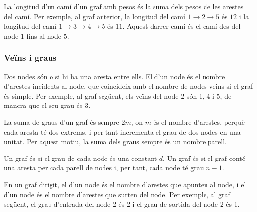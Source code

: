 La longitud d'un camí d'un graf amb pesos és la suma dels pesos de les
arestes del camí. Per exemple, al graf anterior, la longitud del camí
$1 \rightarrow 2 \rightarrow 5$ és $12$ i la longitud del camí $1
\rightarrow 3 \rightarrow 4 \rightarrow 5$ és $11$. Aquest darrer camí
és el camí  des del node $1$ fins al node $5$.

\subsubsection{Veïns i graus}

 

Dos nodes són  o  si hi ha una aresta entre
ells. El  d'un node és el nombre d'arestes incidents al
node, que coincideix amb el nombre de nodes veins si el graf és
simple. Per exemple, al graf següent, els veïns del node 2 són 1, 4 i
5, de manera que el seu grau és 3.


\begin{center}
\end{center}


La suma de graus d'un graf és sempre $2m$, on $m$ és el nombre
d'arestes, perquè cada aresta té dos extrems, i per tant incrementa el
grau de dos nodes en una unitat. Per aquest motiu, la suma dels graus
sempre és un nombre parell.

 

Un graf és  si el grau de cada node és una constant
$d$. Un graf és  si el graf conté una aresta per cada parell
de nodes i, per tant, cada node té grau $n-1$.

 

En un graf dirigit, el  d'un node és el nombre d'arestes
que apunten al node, i el  d'un node és el nombre
d'arestes que surten del node. Per exemple, al graf següent, el grau
d'entrada del node 2 és 2 i el grau de sortida del node 2 és 1.



